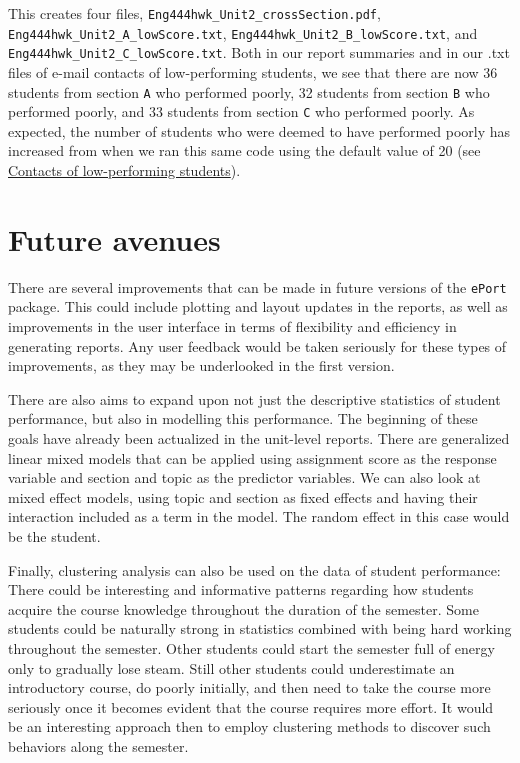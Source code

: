 \documentclass{article}\usepackage[]{graphicx}\usepackage[]{color}
\numberwithin{equation}{section} %
\begin{document}
This creates four files, \texttt{Eng444hwk\_Unit2\_crossSection.pdf}, \texttt{Eng444hwk\_Unit2\_A\_lowScore.txt}, \texttt{Eng444hwk\_Unit2\_B\_lowScore.txt}, and \texttt{Eng444hwk\_Unit2\_C\_lowScore.txt}. Both in our report summaries and in our .txt files of e-mail contacts of low-performing students, we see that there are now 36 students from section \texttt{A} who performed poorly, 32 students from section \texttt{B} who performed poorly, and 33 students from section \texttt{C} who performed poorly. As expected, the number of students who were deemed to have performed poorly has increased from when we ran this same code using the default value of 20 (see \hyperref[sec:lowPer]{Contacts of low-performing students}).

\section{Future avenues}

There are several improvements that can be made in future versions of the \texttt{ePort} package. This could include plotting and layout updates in the reports, as well as improvements in the user interface in terms of flexibility and efficiency in generating reports. Any user feedback would be taken seriously for these types of improvements, as they may be underlooked in the first version.

There are also aims to expand upon not just the descriptive statistics of student performance, but also in modelling this performance. The beginning of these goals have already been actualized in the unit-level reports. There are generalized linear mixed models that can be applied using assignment score as the response variable and section and topic as the predictor variables. We can also look at mixed effect models, using topic and section as fixed effects and having their interaction included as a term in the model. The random effect in this case would be the student.

Finally, clustering analysis can also be used on the data of student performance: There could be interesting and informative patterns regarding how students acquire the course knowledge throughout the duration of the semester. Some students could be naturally strong in statistics combined with being hard working throughout the semester. Other students could start the semester full of energy only to gradually lose steam. Still other students could underestimate an introductory course, do poorly initially, and then need to take the course more seriously once it becomes evident that the course requires more effort. It would be an interesting approach then to employ clustering methods to discover such behaviors along the semester.
\end{document}
